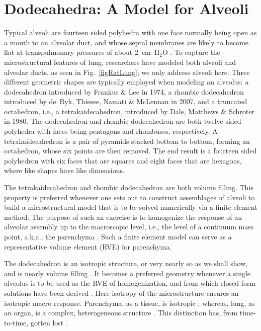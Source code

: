\part{Dodecahedra: A Model for Alveoli}
\label{partDodecahedron}

Typical alveoli are fourteen sided polyhedra with one face normally being open as a mouth to an alveolar duct, and whose septal membranes are likely to become flat at transpulmonary pressures of about 2~cm~$\text{H}_2\text{O}$ \cite{HoppinHildebrandt77}.  To capture the microstructural features of lung, researchers have modeled both alveoli and alveolar ducts, as seen in Fig.~\ref{figRatLung}; we only address alveoli here.  Three different geometric shapes are typically employed when modeling an alveolus: a dodecahedron introduced by Frankus \& Lee \cite{FrankusLee74} in 1974, a rhombic dodecahedron introduced by de~Ryk, Thiesse, Namati \& McLennan \cite{Ryketal07} in 2007, and a truncated octahedron, i.e., a tetrakaidecahedron, introduced by Dale, Matthews \& Schroter \cite{Daleetal80} in 1980.  The dodecahedron and rhombic dodecahedron are both twelve sided polyhedra with faces being pentagons and rhombuses, respectively.  A tetrakaidecahedron is a pair of pyramids stacked bottom to bottom, forming an octahedron, whose six points are then removed.  The end result is a fourteen sided polyhedron with six faces that are squares and eight faces that are hexagons, where like shapes have like dimensions.

The tetrakaidecahedron and rhombic dodecahedron are both volume filling.  This property is preferred whenever one sets out to construct assemblages of alveoli to build a micro\-structural model that is to be solved numerically via a finite element method.  The purpose of such an exercise is to homogenize the response of an alveolar assembly up to the macroscopic level, i.e., the level of a continuum mass point, a.k.a., the parenchyma \cite{Daleetal80,DennySchroter95,DennySchroter97,DennySchroter00,Koweetal86,Ryketal07,Chenetal14}.  Such a finite element model can serve as a representative volume element (RVE) for parenchyma.

The dodecahedron is an isotropic structure, or very nearly so as we shall show, and is nearly volume filling \cite{Kimmeletal87}.  It becomes a preferred geometry whenever a single alveolus is to be used as the RVE of homo\-genization, and from which closed form solutions have been derived \cite{BudianskyKimmel87,KimmelBudiansky90,Kimmeletal87,Freedetal12}.  Here isotropy of the microstructure ensures an isotropic macro response.  Parenchyma, as a tissue, is isotropic \cite{Weedetal15,Fung88,Hughesetal72}; whereas, lung, as an organ, is a complex, heterogeneous structure \cite{Mead73,West07}.  This distinction has, from time-to-time, gotten lost \cite{DennySchroter06}.  

